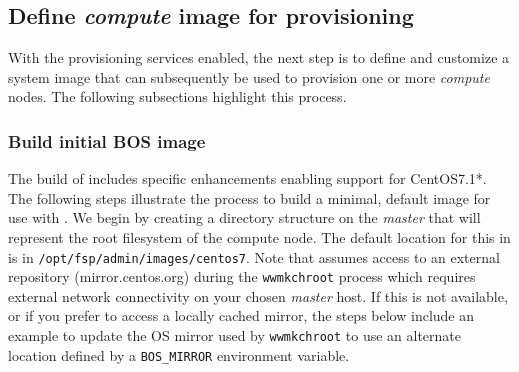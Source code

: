 \documentclass[letterpaper]{article}
\newcommand{\baseOS}{CentOS7.1*}
\begin{document}



\subsection{Define {\em compute} image for provisioning}

With the provisioning services enabled, the next step is to define and
customize a system image that can subsequently be used to provision one or more
{\em compute} nodes. The following subsections highlight this process.

\subsubsection{Build initial BOS image}

The \FSP{} build of \Warewulf{} includes specific enhancements enabling support for
\baseOS{}. The following steps illustrate the process to build a minimal, default
image for use with \Warewulf{}.  We begin by creating a directory structure on the 
{\em master} that will represent the root filesystem of the compute node. The 
default location for this in \FSP{} is in
\texttt{/opt/fsp/admin/images/centos7}. Note that \Warewulf{} assumes access to
an external repository (mirror.centos.org) during the \texttt{wwmkchroot}
process which requires external network connectivity on your chosen {\em
  master} host. If this is not available, or if you prefer to access a locally cached
mirror, the steps below include an example to update the OS mirror used by
\texttt{wwmkchroot} to use an alternate location defined by a
\texttt{BOS\_MIRROR} environment variable.
\end{document}

